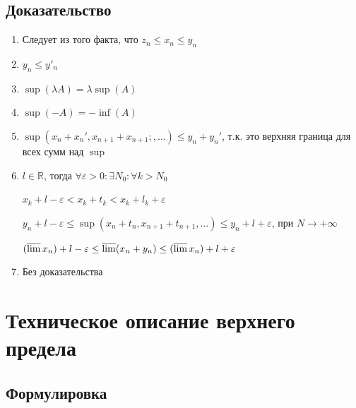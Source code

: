 \documentclass{article}
\begin{document}
        \subsection{Доказательство}
        
            \begin{enumerate}
            
                \item Следует из того факта, что $z_n \leq x_n \leq y_n$
                
                \item $y_n \leq y'_n$
                
                \item $\sup(\lambda A) = \lambda \sup(A)$
                
                \item $\sup(-A) = -\inf(A)$
                
                \item $\sup(x_n + x_n', x_{n + 1} + x_{n + 1};, \ldots) \leq y_n + y_n'$, т.к. это верхняя граница для всех сумм над $\sup$
                
                \item $l \in \mathbb{R}$, тогда $\forall \varepsilon > 0 : \exists N_0: \forall k > N_0$
                
                    $x_k + l - \varepsilon < x_k + t_k < x_k + l_k + \varepsilon$
                    
                    $y_n + l - \varepsilon \leq \sup(x_n + t_n, x_{n + 1} + t_{n + 1}, \ldots) \leq y_n + l + \varepsilon$, при $N \rightarrow +\infty$
                    
                    $(\varlimsup x_n) + l - \varepsilon \leq \varlimsup (x_n + y_n) \leq (\varlimsup x_n) + l + \varepsilon$
                    
                \item Без доказательства
                
            \end{enumerate}
            
    \newpage
    
    \section{Техническое описание верхнего предела}
    
        \subsection{Формулировка}
        
\end{document}
